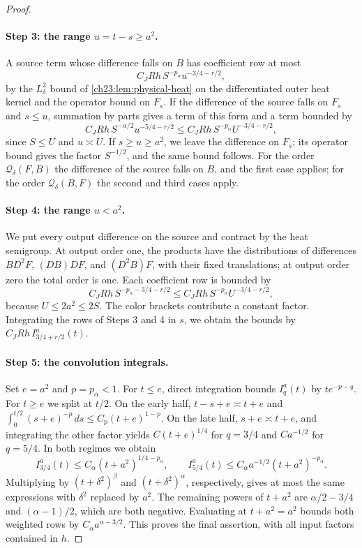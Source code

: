 \begin{proof}
\paragraph{Step 3: the range $u=t-s\ge a^2$.}
A source term whose difference falls on $B$ has coefficient row at most
\[
 C_JRh\,S^{-p_\alpha}u^{-3/4-r/2},
\]
by the $L^2_\delta$ bound of \cref{ch23:lem:physical-heat} on the differentiated outer heat kernel and the operator bound on $F_s$. If the difference of the source falls on $F_s$ and $s\le u$, summation by parts gives a term of this form and a term bounded by
\[
 C_JRh\,S^{-\alpha/2}u^{-5/4-r/2}\le C_JRh\,S^{-p_\alpha}U^{-3/4-r/2},
\]
since $S\le U$ and $u\asymp U$. If $s\ge u\ge a^2$, we leave the difference on $F_s$; its operator bound gives the factor $S^{-1/2}$, and the same bound follows. For the order $\mathcal Q_\delta(F,B)$ the difference of the source falls on $B$, and the first case applies; for the order $\mathcal Q_\delta(B,F)$ the second and third cases apply.

\paragraph{Step 4: the range $u<a^2$.}
We put every output difference on the source and contract by the heat semigroup. At output order one, the products have the distributions of differences $BD^2F$, $(DB)DF$, and $(D^2B)F$, with their fixed translations; at output order zero the total order is one. Each coefficient row is bounded by
\[
 C_JRh\,S^{-p_\alpha-3/4-r/2}\le C_JRh\,S^{-p_\alpha}U^{-3/4-r/2},
\]
because $U\le2a^2\le2S$. The color brackets contribute a constant factor. Integrating the rows of Steps 3 and 4 in $s$, we obtain the bounds by $C_JRh\,I_{3/4+r/2}^a(t)$.

\paragraph{Step 5: the convolution integrals.}
Set $e=a^2$ and $p=p_\alpha<1$. For $t\le e$, direct integration bounds $I_q^a(t)$ by $te^{-p-q}$. For $t\ge e$ we split at $t/2$. On the early half, $t-s+e\asymp t+e$ and $\int_0^{t/2}(s+e)^{-p}\,ds\le C_p(t+e)^{1-p}$. On the late half, $s+e\asymp t+e$, and integrating the other factor yields $C(t+e)^{1/4}$ for $q=3/4$ and $Ca^{-1/2}$ for $q=5/4$. In both regimes we obtain
\begin{equation}\label{ch23:eq:profile-bounds}
 I_{3/4}^a(t)\le C_\alpha(t+a^2)^{1/4-p_\alpha},\qquad
 I_{5/4}^a(t)\le C_\alpha a^{-1/2}(t+a^2)^{-p_\alpha}.
\end{equation}
Multiplying by $(t+\delta^2)^\beta$ and $(t+\delta^2)^\alpha$, respectively, gives at most the same expressions with $\delta^2$ replaced by $a^2$. The remaining powers of $t+a^2$ are $\alpha/2-3/4$ and $(\alpha-1)/2$, which are both negative. Evaluating at $t+a^2=a^2$ bounds both weighted rows by $C_\alpha a^{\alpha-3/2}$. This proves the final assertion, with all input factors contained in $h$.
\end{proof}

